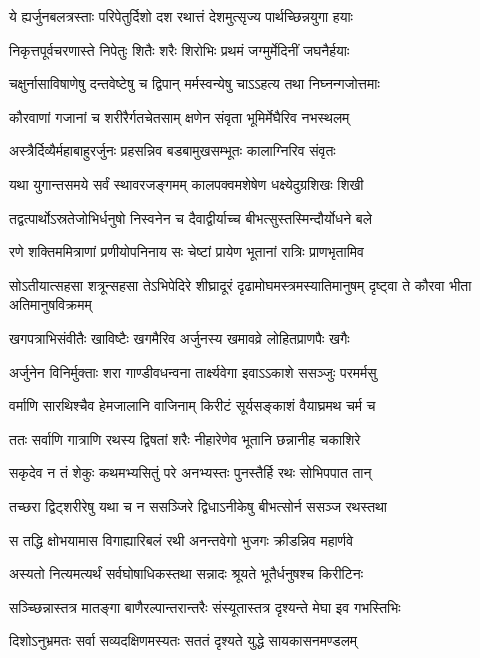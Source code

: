 \twolineshloka
{ये ह्यर्जुनबलत्रस्ताः परिपेतुर्दिशो दश}
{रथात्तं देशमुत्सृज्य पार्थच्छिन्नयुगा हयाः}


\twolineshloka
{निकृत्तपूर्वचरणास्ते निपेतुः शितैः शरैः}
{शिरोभिः प्रथमं जग्मुर्मेदिनीं जघनैर्हयाः}


\twolineshloka
{चक्षुर्नासाविषाणेषु दन्तवेष्टेषु च द्विपान्}
{मर्मस्वन्येषु चाऽऽहत्य तथा निघ्नन्गजोत्तमाः}


\twolineshloka
{कौरवाणां गजानां च शरीरैर्गतचेतसाम्}
{क्षणेन संवृता भूमिर्मेघैरिव नभस्थलम्}


\twolineshloka
{अस्त्रैर्दिव्यैर्महाबाहुरर्जुनः प्रहसन्निव}
{बडबामुखसम्भूतः कालाग्निरिव संवृतः}


\twolineshloka
{यथा युगान्तसमये सर्वं स्थावरजङ्गमम्}
{कालपक्वमशेषेण धक्ष्येदुग्रशिखः शिखी}


\twolineshloka
{तद्वत्पार्थोऽस्रतेजोभिर्धनुषो निस्वनेन च}
{दैवाद्वीर्याच्च बीभत्सुस्तस्मिन्दौर्योधने बले}


\twolineshloka
{रणे शक्तिममित्राणां प्रणीयोपनिनाय सः}
{चेष्टां प्रायेण भूतानां रात्रिः प्राणभृतामिव}


\threelineshloka
{सोऽतीयात्सहसा शत्रून्सहसा तेऽभिपेदिरे}
{शीघ्रादूरं दृढामोघमस्त्रमस्यातिमानुषम्}
{दृष्ट्वा ते कौरवा भीता अतिमानुषविक्रमम्}


\twolineshloka
{खगपत्राभिसंवीतैः खाविष्टैः खगमैरिव}
{अर्जुनस्य खमावव्रे लोहितप्राणपैः खगैः}


\twolineshloka
{अर्जुनेन विनिर्मुक्ताः शरा गाण्डीवधन्वना}
{तार्क्ष्यवेगा इवाऽऽकाशे ससञ्जुः परमर्मसु}


\twolineshloka
{वर्माणि सारथिश्चैव हेमजालानि वाजिनाम्}
{किरीटं सूर्यसङ्काशं वैयाघ्रमथ चर्म च}


\twolineshloka
{ततः सर्वाणि गात्राणि रथस्य द्विषतां शरैः}
{नीहारेणेव भूतानि छन्नानीह चकाशिरे}


\twolineshloka
{सकृदेव न तं शेकुः कथमभ्यसितुं परे}
{अनभ्यस्तः पुनस्तैर्हि रथः सोभिपपात तान्}


\twolineshloka
{तच्छरा द्विट्शरीरेषु यथा च न ससञ्जिरे}
{द्विधाऽनीकेषु बीभत्सोर्न ससञ्ज रथस्तथा}


\twolineshloka
{स तद्धि क्षोभयामास विगाह्यारिबलं रथी}
{अनन्तवेगो भुजगः क्रीडन्निव महार्णवे}


\twolineshloka
{अस्यतो नित्यमत्यर्थं सर्वघोषाधिकस्तथा}
{सन्नादः श्रूयते भूतैर्धनुषश्च किरीटिनः}


\twolineshloka
{सञ्च्छिन्नास्तत्र मातङ्गा बाणैरल्पान्तरान्तरैः}
{संस्यूतास्तत्र दृश्यन्ते मेघा इव गभस्तिभिः}


\twolineshloka
{दिशोऽनुभ्रमतः सर्वा सव्यदक्षिणमस्यतः}
{सततं दृश्यते युद्धे सायकासनमण्डलम्}


